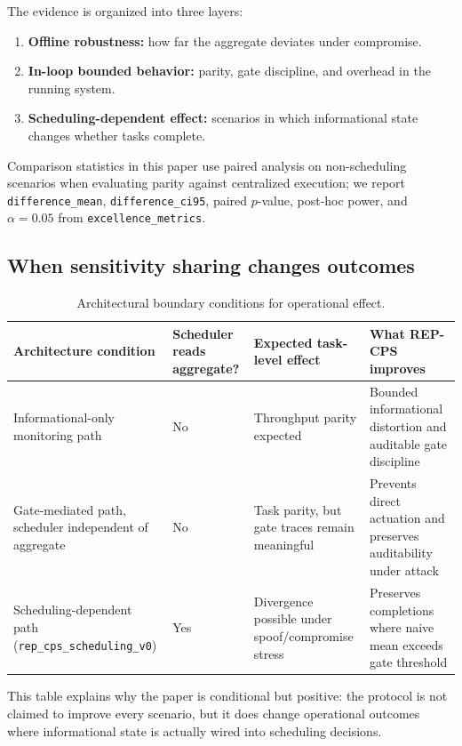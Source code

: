 \documentclass[11pt]{article}
\newcommand{\repcps}{REP-CPS}
\newcommand{\field}[1]{\texttt{#1}}
\newcommand{\code}[1]{\texttt{#1}}
\begin{document}
The evidence is organized into three layers:
\begin{enumerate}[leftmargin=1.5em]
    \item \textbf{Offline robustness:} how far the aggregate deviates under compromise.
    \item \textbf{In-loop bounded behavior:} parity, gate discipline, and overhead in the running system.
    \item \textbf{Scheduling-dependent effect:} scenarios in which informational state changes whether tasks complete.
\end{enumerate}
Comparison statistics in this paper use paired analysis on non-scheduling scenarios when evaluating parity against centralized execution; we report \field{difference\_mean}, \field{difference\_ci95}, paired $p$-value, post-hoc power, and $\alpha=0.05$ from \field{excellence\_metrics}.

\subsection{When sensitivity sharing changes outcomes}

\begin{table}[H]
\centering
\caption{Architectural boundary conditions for operational effect.}
\label{tab:boundary}
\begin{tabularx}{\linewidth}{p{3.4cm}p{2.2cm}p{3.6cm}X}
\toprule
Architecture condition & Scheduler reads aggregate? & Expected task-level effect & What \repcps{} improves \\
\midrule
Informational-only monitoring path & No & Throughput parity expected & Bounded informational distortion and auditable gate discipline \\
Gate-mediated path, scheduler independent of aggregate & No & Task parity, but gate traces remain meaningful & Prevents direct actuation and preserves auditability under attack \\
Scheduling-dependent path (\code{rep\_cps\_scheduling\_v0}) & Yes & Divergence possible under spoof/compromise stress & Preserves completions where naive mean exceeds gate threshold \\
\bottomrule
\end{tabularx}
\end{table}

This table explains why the paper is conditional but positive: the protocol is not claimed to improve every scenario, but it does change operational outcomes where informational state is actually wired into scheduling decisions.
\end{document}
